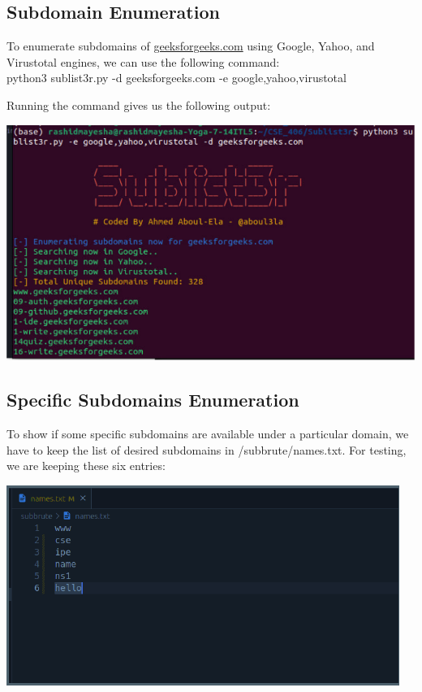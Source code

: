 \documentclass[12pt]{article}
\begin{document}
\subsection{Subdomain Enumeration}\label{subsec:subdomain-enumeration}

To enumerate subdomains of \href{http://geeksforgeeks.com}{geeksforgeeks.com} using Google, Yahoo, and Virustotal engines, we can use the following command:\\
python3 sublist3r.py -d geeksforgeeks.com -e google,yahoo,virustotal

Running the command gives us the following output:

\begin{center}
    \includegraphics[max width=\textwidth]{Image4.png}
\end{center}

\subsection{Specific Subdomains Enumeration}\label{subsec:specific-subdomains-enumeration}
To show if some specific subdomains are available under a particular domain, we have to keep the list of desired subdomains in /subbrute/names.txt. For testing, we are keeping these six entries:

\begin{center}
    \includegraphics[max width=\textwidth]{Image5.png}
\end{center}
\end{document}
